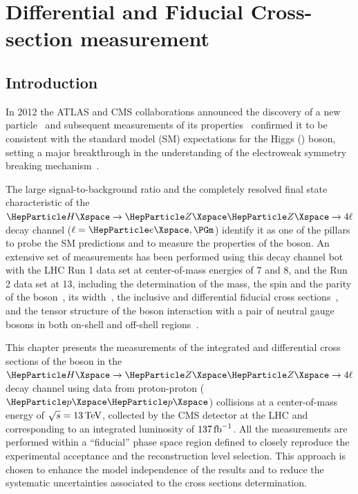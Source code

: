 \chapter{Differential and Fiducial Cross-section measurement}

\section{Introduction} \label{sec:intro}
In 2012 the ATLAS and CMS collaborations announced the discovery of a new particle~\cite{Aad:2012tfa,Chatrchyan:2012ufa,Chatrchyan:2013lba} and subsequent measurements of its properties~\cite{ATLASPropertiesRun1,CMSPropertiesRun1,ATLASCMSMassRun1,ATLASCMSPropertiesRun1} confirmed it to be consistent with the standard model (SM) expectations for the Higgs (\PH) boson, setting a major breakthrough in the understanding of the electroweak symmetry breaking mechanism~\cite{Englert:1964et,Higgs:1964ia,Higgs:1964pj,Guralnik:1964eu,Higgs:1966ev,Kibble:1967sv}.

The large signal-to-background ratio and the completely resolved final state characteristic of the $\HZZfl$ decay channel ($\ell=\Pe,\Pgm$) identify it as one of the pillars to probe the SM predictions and to measure the properties of the \PH boson.
An extensive set of measurements has been performed using this decay channel bot with the LHC Run 1 data set at center-of-mass energies of 7 and 8\TeV, and the Run 2 data set at 13\TeV, including the determination of
the mass, the spin and the parity of the \PH boson~\cite{ATLASH4lLegacyRun1,CMSH4lLegacyRun1,CMSH4lSpinParity,CMSH4lAnomalousCouplings,CMSH4l2016,ATLASH4l2016},
its width~\cite{CMSH4lWidth,CMSH4lLifetime,ATLASH4lWidth,ATLASH4lWidth2016}, the inclusive and differential fiducial cross sections~\cite{ATLASH4lFiducial8TeV,CMSH4lFiducial8TeV, CMSH4l2016,ATLASH4lFiducial2016, ATLASH4lLegacyRun2, ATLASH4lFiducialRun2}, and the tensor structure of the \PH boson interaction with a pair of neutral gauge bosons in both on-shell and off-shell regions~\cite{CMSH4lAnomalousCouplings,CMSH4lLifetime, CMSH4lAnomalousCouplings2016,ATLASH4l2016,CMSHVVAnomalousCouplings2016}.

This chapter presents the measurements of the integrated and differential cross sections of the \PH boson in the $\HZZfl$ decay channel using data from proton-proton ($\Pp\Pp$) collisions at a center-of-mass energy of $\sqrt{s}=13\,\text{Te\hspace{-.08em}V}$, collected by the CMS detector at the LHC and corresponding to an integrated luminosity of $137\mbox{\ensuremath{\,\text{fb}^{-1}}}$. 
All the measurements are performed within a ``fiducial'' phase space region defined to closely reproduce the experimental acceptance and the reconstruction level selection.
This approach is chosen to enhance the model independence of the results and to reduce the systematic uncertainties associated to the cross sections determination.


